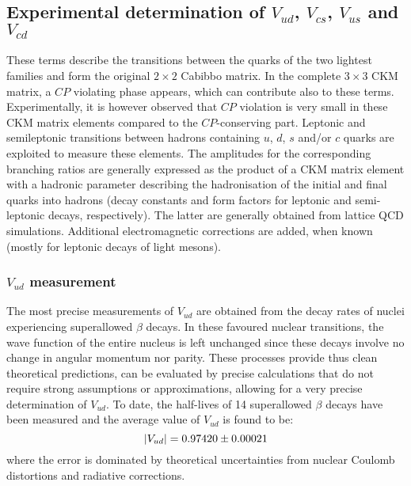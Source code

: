 \documentclass[../../main/main.tex]{subfiles}
\begin{document}
\subsection{Experimental determination of \( V_{ud} \), \( V_{cs} \), \( V_{us} \) and \( V_{cd} \)}
These terms describe the transitions between the quarks of the two lightest families and form the original \( 2 \times 2 \) Cabibbo matrix. In the complete \( 3 \times 3 \) CKM matrix, a \( CP \) violating phase appears, which can contribute also to these terms. Experimentally, it is however observed that \( CP \) violation is very small in these CKM matrix elements compared to the \( CP \)-conserving part.
Leptonic and semileptonic transitions between hadrons containing \( u \), \( d \), \( s \) and/or \( c \) quarks are exploited to measure these elements. The amplitudes for the corresponding branching ratios are generally expressed as the product of a CKM matrix element with a hadronic parameter describing the hadronisation of the initial and final quarks into hadrons (decay constants and form factors for leptonic and semi-leptonic decays, respectively). The latter are generally obtained from lattice QCD simulations. Additional electromagnetic corrections are added, when known (mostly for leptonic decays of light mesons).


\subsubsection*{\( V_{ud} \) measurement}
The most precise measurements of \( V_{ud} \) are obtained from the decay rates of nuclei experiencing superallowed \( \beta \) decays. In these favoured nuclear transitions, the wave function of the entire nucleus is left unchanged since these decays involve no change in angular momentum nor parity. These processes provide thus clean theoretical predictions, can be evaluated by precise calculations that do not require strong assumptions or approximations, allowing for a very precise determination of \( V_{ud} \). To date, the half-lives of 14 superallowed \( \beta \) decays have been measured and the average value of \( V_{ud} \) is found to be:
\begin{equation}
	\abs{V_{ud}}
	=
	0.97420 \pm 0.00021
	\label{eq:}
\end{equation}
where the error is dominated by theoretical uncertainties from nuclear Coulomb distortions and radiative corrections.
\end{document}
